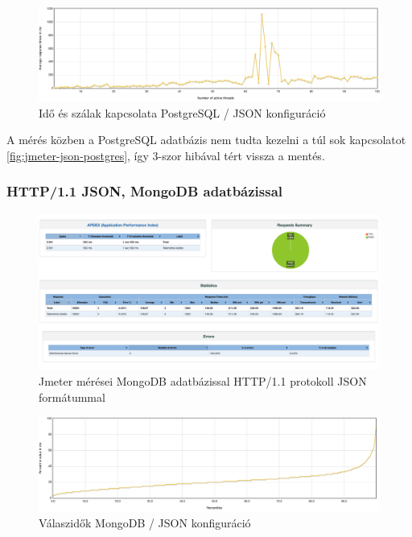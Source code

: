 \begin{figure}[hbt!]
    \centering
    \includegraphics[scale=0.3]{images/json-time-vs-threads}
    \caption{Idő és szálak kapcsolata PostgreSQL / JSON konfiguráció}
    \label{fig:json-time-vs-threads}
\end{figure}

A mérés közben a PostgreSQL adatbázis nem tudta kezelni a túl sok kapcsolatot \ref{fig:jmeter-json-postgres}, így 3-szor hibával tért vissza a mentés.

\subsubsection{HTTP/1.1 JSON, MongoDB adatbázissal}
\begin{figure}[hbt!]
    \centering
    \includegraphics[scale=0.2]{images/jmeter-json-postgres}
    \caption{Jmeter mérései MongoDB adatbázissal HTTP/1.1 protokoll JSON formátummal}
    \label{fig:jmeter-json-mongo}
\end{figure}

\begin{figure}[hbt!]
    \centering
    \includegraphics[scale=0.3]{images/json-mongo-response-times}
    \caption{Válaszidők MongoDB / JSON konfiguráció}
    \label{fig:json-mongo-response-times}
\end{figure}

